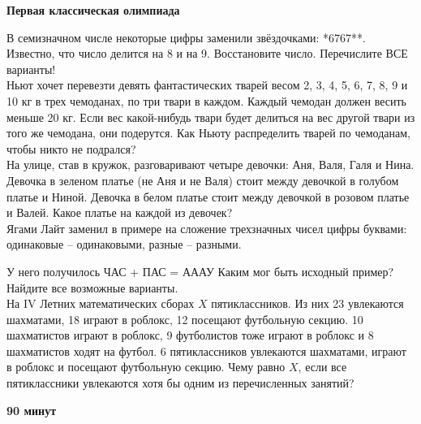 \centerline{\bf \Huge Первая классическая олимпиада}

 В семизначном числе некоторые цифры заменили
звёздочками: *6767**. Известно, что число делится на 8 и на 9. Восстановите число. Перечислите ВСЕ варианты!\\


 Ньют хочет перевезти девять фантастических тварей
весом 2, 3, 4, 5, 6, 7, 8, 9 и 10 кг в трех чемоданах, по три твари в каждом. Каждый чемодан должен весить меньше 20 кг. Если вес какой-нибудь твари будет делиться на вес другой твари из того же чемодана, они подерутся. Как Ньюту распределить тварей по чемоданам, чтобы никто не подрался?\\


 На улице, став в кружок, разговаривают четыре девочки: Аня, Валя, Галя и Нина. Девочка в зеленом платье (не Аня и не Валя) стоит между девочкой в голубом платье и Ниной. Девочка в белом платье стоит между девочкой в розовом платье и Валей. Какое платье на каждой из девочек?\\

 Ягами Лайт заменил в примере на сложение трехзначных чисел цифры буквами: одинаковые – одинаковыми, разные – разными.

У него получилось ЧАС + ПАС = АААУ Каким мог быть исходный пример? Найдите все возможные варианты.\\

 На IV Летних математических сборах $X$ пятиклассников. Из них 23 увлекаются шахматами, 18 играют в роблокс, 12 посещают футбольную секцию. 10 шахматистов играют в роблокс, 9 футболистов тоже играют в роблокс и 8 шахматистов ходят на футбол. 6 пятиклассников увлекаются шахматами, играют в роблокс и посещают футбольную секцию. Чему равно $X$, если все пятиклассники увлекаются хотя бы одним из перечисленных занятий?\\

\centerline{\textbf{90 минут}}